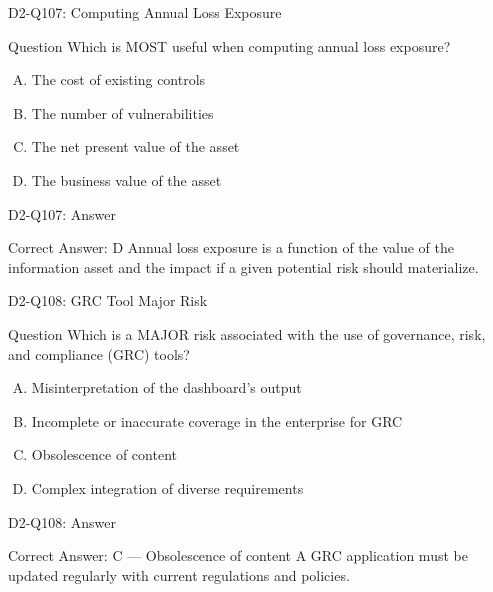 \documentclass{beamer}
\begin{document}
	\begin{frame}{D2-Q107: Computing Annual Loss Exposure}
		\begin{block}{Question}
			Which is MOST useful when computing annual loss exposure?
		\end{block}
		\begin{enumerate}[(A)]
			\item The cost of existing controls
			\item The number of vulnerabilities
			\item The net present value of the asset
			\item The business value of the asset
		\end{enumerate}
	\end{frame}
	\begin{frame}{D2-Q107: Answer}
		\begin{block}{Correct Answer: D}
			Annual loss exposure is a function of the value of the information asset and the impact if a given potential risk should materialize.
		\end{block}
	\end{frame}
	
	\begin{frame}{D2-Q108: GRC Tool Major Risk}
		\begin{block}{Question}
			Which is a MAJOR risk associated with the use of governance, risk, and compliance (GRC) tools?
		\end{block}
		\begin{enumerate}[(A)]
			\item Misinterpretation of the dashboard's output
			\item Incomplete or inaccurate coverage in the enterprise for GRC
			\item Obsolescence of content
			\item Complex integration of diverse requirements
		\end{enumerate}
	\end{frame}
	\begin{frame}{D2-Q108: Answer}
		\begin{block}{Correct Answer: C --- Obsolescence of content}
			A GRC application must be updated regularly with current regulations and policies.
		\end{block}
	\end{frame}
	
\end{document}
